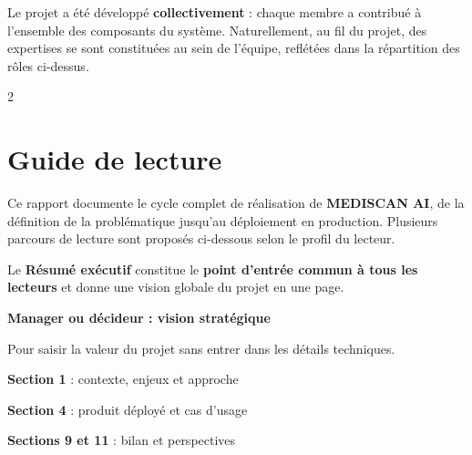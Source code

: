 \documentclass[12pt,a4paper]{article}
\begin{document}
\vspace{1.5cm}

\noindent Le projet a été développé \textbf{collectivement} : chaque membre a contribué
à l'ensemble des composants du système. Naturellement, au fil du projet, des expertises
se sont constituées au sein de l'équipe, reflétées dans la répartition des rôles ci-dessus.

\newpage
\begingroup
\setlength{\columnsep}{1cm}
\renewcommand{\baselinestretch}{1.1}\fontsize{11pt}{13pt}\selectfont
\begin{multicols}{2}
\tableofcontents
\end{multicols}
\endgroup

\newpage
\listoffigures
\listoftables

\newpage
\section*{Guide de lecture}

\vspace{0.3cm}

Ce rapport documente le cycle complet de réalisation de \textbf{MEDISCAN AI},
de la définition de la problématique jusqu'au déploiement en production.
Plusieurs parcours de lecture sont proposés ci-dessous selon le profil du lecteur.

\vspace{0.3cm}
Le \textbf{Résumé exécutif} constitue le \textbf{point d'entrée commun à tous les lecteurs}
et donne une vision globale du projet en une page.

\vspace{0.6cm}

\textbf{Manager ou décideur : vision stratégique}

\vspace{0.15cm}
Pour saisir la valeur du projet sans entrer dans les détails techniques.
\begin{sq}
  \item \textbf{Section 1} : contexte, enjeux et approche
  \item \textbf{Section 4} : produit déployé et cas d'usage
  \item \textbf{Sections 9 et 11} : bilan et perspectives
\end{sq}
\end{document}

